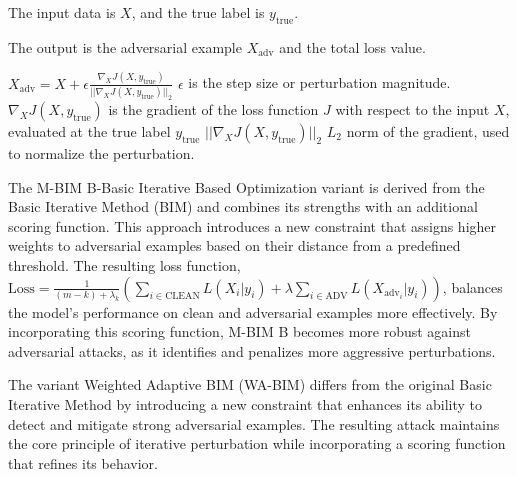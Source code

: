 The input data is \(X\), and the true label is \(y_{\text{true}}\).

The output is the adversarial example \(X_{\text{adv}}\) and the total loss value.

$X_{\text{adv}} = X + \epsilon \frac{\nabla_X J(X, y_{\text{true}})}{||\nabla_X J(X, y_{\text{true}})||_2}$
$\epsilon$ is the step size or perturbation magnitude.
$\nabla_X J(X, y_{\text{true}})$ is the gradient of the loss function $J$ with respect to the input $X$, evaluated at the true label $y_{\text{true}}$
$||\nabla_X J(X, y_{\text{true}})||_2$  $L_2$ norm of the gradient, used to normalize the perturbation.

The M-BIM B-Basic Iterative Based Optimization variant is derived from the Basic Iterative Method (BIM) and combines its strengths with an additional scoring function. This approach introduces a new constraint that assigns higher weights to adversarial examples based on their distance from a predefined threshold. The resulting loss function, $\text{Loss} = \frac{1}{{(m - k)} + \lambda_k} \left( \sum_{i \in \text{CLEAN}} L(X_i | y_i) + \lambda \sum_{i \in \text{ADV}} L(X_{\text{adv}_i} | y_i) \right)$, balances the model's performance on clean and adversarial examples more effectively. By incorporating this scoring function, M-BIM B becomes more robust against adversarial attacks, as it identifies and penalizes more aggressive perturbations.

The variant Weighted Adaptive BIM (WA-BIM) differs from the original Basic Iterative Method by introducing a new constraint that enhances its ability to detect and mitigate strong adversarial examples. The resulting attack maintains the core principle of iterative perturbation while incorporating a scoring function that refines its behavior.